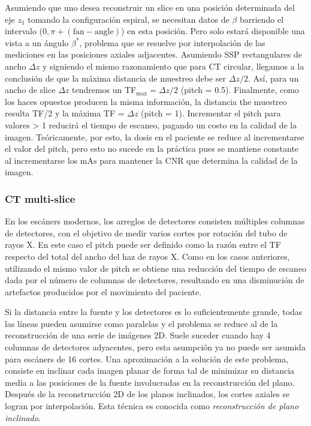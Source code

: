 Asumiendo que uno desea reconstruir un slice en una posici{\'o}n determinada
del eje $z_1$ tomando la configuraci{\'o}n espiral, se necesitan datos de
$\beta$ barriendo el intervalo ($0, \pi + (\text{fan} - \text{angle})$) en
esta posici{\'o}n. Pero solo estar{\'a} disponible una vista a un {\'a}ngulo
$\beta^{\ast}$, problema que se resuelve por interpolaci{\'o}n de las
mediciones en las posiciones axiales adjacentes. Asumiendo SSP rectangulares
de ancho $\Delta z$ y siguiendo el mismo razonamiento que para CT circular,
llegamos a la conclusi{\'o}n de que la m{\'a}xima distancia de muestreo debe
ser $\Delta z / 2$. As{\'i}, para un ancho de slice $\Delta z$ tendremos un
TF$_{\max} = \Delta z / 2$ (pitch = 0.5). Finalmente, como los haces opuestos
producen la misma informaci{\'o}n, la distancia the muestreo resulta TF/2 y la
m{\'a}xima TF = $\Delta z$ (pitch = 1). Incrementar el pitch para valores > 1
reducir{\'a} el tiempo de escaneo, pagando un costo en la calidad de la
imagen. Te{\'o}ricamente, por esto, la dosis en el paciente se reduce al
incrementarse el valor del pitch, pero esto no sucede en la pr{\'a}ctica pues
se mantiene constante al incrementarse los $\text{mAs}$ para mantener la CNR
que determina la calidad de la imagen.

\subsubsection{CT multi-slice}

En los esc{\'a}ners modernos, los arreglos de detectores consisten
m{\'u}ltiples columnas de detectores, con el objetivo de medir varios cortes
por rotaci{\'o}n del tubo de rayos X. En este caso el pitch puede ser definido
como la raz{\'o}n entre el TF respecto del total del ancho del haz de rayos X.
Como en los casos anteriores, utilizando el mismo valor de pitch se obtiene
una reducci{\'o}n del tiempo de escaneo dada por el n{\'u}mero de columnas de
detectores, resultando en una disminuci{\'o}n de artefactos producidos por el
movimiento del paciente.

Si la distancia entre la fuente y los detectores es lo suficientemente grande,
todas las l{\'i}neas pueden asumirse como paralelas y el problema se reduce al
de la reconstrucci{\'o}n de una serie de im{\'a}genes 2D. Suele suceder cuando
hay 4 columnas de detectores adyacentes, pero esta asumpci{\'o}n ya no puede
ser asumida para esc{\'a}ners de 16 cortes. Una aproximaci{\'o}n a la
soluci{\'o}n de este problema, consiste en inclinar cada imagen planar de
forma tal de minimizar su distancia media a las posiciones de la fuente
involucradas en la reconstrucci{\'o}n del plano. Despu{\'e}s de la
reconstrucci{\'o}n 2D de los planos inclinados, los cortes axiales se logran
por interpolaci{\'o}n. Esta t{\'e}cnica es conocida como
{\emph{reconstrucci{\'o}n de plano inclinado}}.


